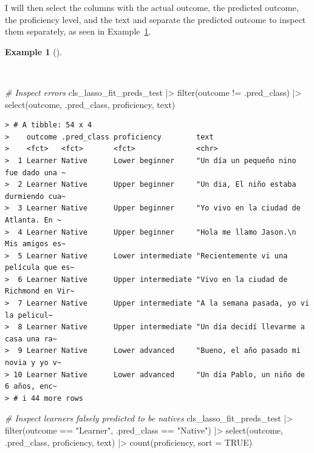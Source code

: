 \documentclass[
  letterpaper,
]{latex/krantz}
\newenvironment{Shaded}{\begin{snugshade}}{\end{snugshade}}
\newcommand{\AttributeTok}[1]{\textcolor[rgb]{0.00,0.00,0.00}{#1}}
\newcommand{\CommentTok}[1]{\textcolor[rgb]{0.00,0.00,0.00}{\textit{#1}}}
\newcommand{\ConstantTok}[1]{\textcolor[rgb]{0.00,0.00,0.00}{#1}}
\newcommand{\FunctionTok}[1]{\textcolor[rgb]{0.00,0.00,0.00}{#1}}
\newcommand{\NormalTok}[1]{\textcolor[rgb]{0.00,0.00,0.00}{#1}}
\newcommand{\SpecialCharTok}[1]{\textcolor[rgb]{0.00,0.00,0.00}{#1}}
\newcommand{\StringTok}[1]{\textcolor[rgb]{0.00,0.00,0.00}{#1}}
\theoremstyle{definition}
\newtheorem{example}{Example}[chapter]
\theoremstyle{remark}
\begin{document}
I will then select the columns with the actual outcome, the predicted
outcome, the proficiency level, and the text and separate the predicted
outcome to inspect them separately, as seen in
Example~\ref{exm-pda-class-tune-hyperparameters-evaluate-test-errors}.

\begin{example}[]\protect\hypertarget{exm-pda-class-tune-hyperparameters-evaluate-test-errors}{}\label{exm-pda-class-tune-hyperparameters-evaluate-test-errors}

~

\begin{Shaded}
\begin{Highlighting}[]
\CommentTok{\# Inspect errors}
\NormalTok{cls\_lasso\_fit\_preds\_test }\SpecialCharTok{|\textgreater{}}
  \FunctionTok{filter}\NormalTok{(outcome }\SpecialCharTok{!=}\NormalTok{ .pred\_class) }\SpecialCharTok{|\textgreater{}}
  \FunctionTok{select}\NormalTok{(outcome, .pred\_class, proficiency, text)}
\end{Highlighting}
\end{Shaded}

\begin{verbatim}
> # A tibble: 54 x 4
>    outcome .pred_class proficiency        text                                  
>    <fct>   <fct>       <fct>              <chr>                                 
>  1 Learner Native      Lower beginner     "Un día un pequeño nino fue dado una ~
>  2 Learner Native      Upper beginner     "Un dia, El niño estaba durmiendo cua~
>  3 Learner Native      Upper beginner     "Yo vivo en la ciudad de Atlanta. En ~
>  4 Learner Native      Upper beginner     "Hola me llamo Jason.\n Mis amigos es~
>  5 Learner Native      Lower intermediate "Recientemente vi una película que es~
>  6 Learner Native      Upper intermediate "Vivo en la ciudad de Richmond en Vir~
>  7 Learner Native      Upper intermediate "A la semana pasada, yo vi la pelicul~
>  8 Learner Native      Upper intermediate "Un día decidí llevarme a casa una ra~
>  9 Learner Native      Lower advanced     "Bueno, el año pasado mi novia y yo v~
> 10 Learner Native      Lower advanced     "Un día Pablo, un niño de 6 años, enc~
> # i 44 more rows
\end{verbatim}

\begin{Shaded}
\begin{Highlighting}[]
\CommentTok{\# Inspect learners falsely predicted to be natives}
\NormalTok{cls\_lasso\_fit\_preds\_test }\SpecialCharTok{|\textgreater{}}
  \FunctionTok{filter}\NormalTok{(outcome }\SpecialCharTok{==} \StringTok{"Learner"}\NormalTok{, .pred\_class }\SpecialCharTok{==} \StringTok{"Native"}\NormalTok{) }\SpecialCharTok{|\textgreater{}}
  \FunctionTok{select}\NormalTok{(outcome, .pred\_class, proficiency, text) }\SpecialCharTok{|\textgreater{}}
  \FunctionTok{count}\NormalTok{(proficiency, }\AttributeTok{sort =} \ConstantTok{TRUE}\NormalTok{)}
\end{Highlighting}
\end{Shaded}


\end{example}
\end{document}

